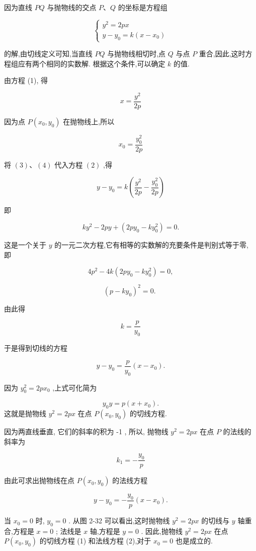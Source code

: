 \documentclass[lang=cn,newtx,10pt,scheme=chinese]{elegantbook}
\begin{document}
因为直线 \({PQ}\) 与抛物线的交点 \(P\text{、}Q\) 的坐标是方程组

\[
  \left\{ \begin{array}{l} {y}^{2} = {2px} \\ y - {y}_{0} = k\left( {x - {x}_{0}}\right) \end{array}\right. \tag{1 2}
\]

的解,由切线定义可知,当直线 \({PQ}\) 与抛物线相切时,点 \(Q\) 与点 \(P\) 重合,因此,这时方程组应有两个相同的实数解. 根据这个条件,可以确定 \(k\) 的值.

由方程 (1), 得

\[
  x = \frac{{y}^{2}}{2p} \tag{3}
\]

因为点 \(P\left( {{x}_{0},{y}_{0}}\right)\) 在抛物线上,所以

\[
    {x}_{0} = \frac{{y}_{0}^{2}}{2p} \tag{4}
\]

将 \(\left( 3\right) \text{、}\left( 4\right)\) 代入方程 \(\left( 2\right)\) ,得

\[
  y - {y}_{0} = k\left( {\frac{{y}^{2}}{2p} - \frac{{y}_{0}^{2}}{2p}}\right)
\]

即

\[
  k{y}^{2} - {2py} + \left( {{2p}{y}_{0} - k{y}_{0}^{2}}\right) = 0.
\]

这是一个关于 \(y\) 的一元二次方程,它有相等的实数解的充要条件是判别式等于零, 即

\[
  4{p}^{2} - {4k}\left( {{2p}{y}_{0} - k{y}_{0}^{2}}\right) = 0,
\]

\[
    {\left( p - k{y}_{0}\right) }^{2} = 0\text{. }
\]

由此得

\[
  k = \frac{p}{{y}_{0}}
\]

于是得到切线的方程

\[
  y - {y}_{0} = \frac{p}{{y}_{0}}\left( {x - {x}_{0}}\right) .
\]

因为 \({y}_{0}^{2} = {2p}{x}_{0}\) ,上式可化简为

\begin{corollary}[抛物线 \({y}^{2} = {2px}\) 的切线方程]
\[
    {y}_{0}y = p\left( {x + {x}_{0}}\right) . \tag{1}
\]
这就是抛物线 \({y}^{2} = {2px}\) 在点 \(P\left( {{x}_{0},{y}_{0}}\right)\) 的切线方程.
\end{corollary}
因为两直线垂直, 它们的斜率的积为 -1 , 所以, 抛物线 \({y}^{2} = {2px}\) 在点 \(P\) 的法线的斜率为

\[
    {k}_{1} = - \frac{{y}_{0}}{p}
\]

由此可求出抛物线在点 \(P\left( {{x}_{0},{y}_{0}}\right)\) 的法线方程
\begin{corollary}[抛物线 \({y}^{2} = {2px}\) 的法线方程]
\[
  y - {y}_{0} = - \frac{{y}_{0}}{p}\left( {x - {x}_{0}}\right) . \tag{2}
\]
\end{corollary}
当 \({x}_{0} = 0\) 时, \({y}_{0} = 0\) . 从图 2-32 可以看出,这时抛物线 \({y}^{2} = {2px}\) 的切线与 \(y\) 轴重合,方程是 \(x = 0\) ; 法线是 \(x\) 轴,方程是 \(y = 0\) . 因此,抛物线 \({y}^{2} = {2px}\) 在点 \(P\left( {{x}_{0},{y}_{0}}\right)\) 的切线方程 (1) 和法线方程 (2),对于 \({x}_{0} = 0\) 也是成立的.
\end{document}
